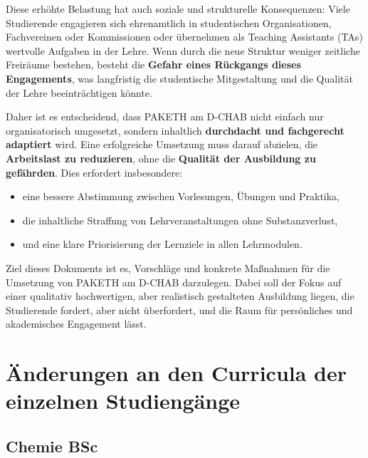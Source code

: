 \documentclass[a4paper]{article}
\begin{document}
Diese erhöhte Belastung hat auch soziale und strukturelle Konsequenzen:  
Viele Studierende engagieren sich ehrenamtlich in studentischen Organisationen, Fachvereinen oder Kommissionen oder übernehmen als Teaching Assistants (TAs) wertvolle Aufgaben in der Lehre.  
Wenn durch die neue Struktur weniger zeitliche Freiräume bestehen, besteht die \textbf{Gefahr eines Rückgangs dieses Engagements}, was langfristig die studentische Mitgestaltung und die Qualität der Lehre beeinträchtigen könnte.  

Daher ist es entscheidend, dass PAKETH am D-CHAB nicht einfach nur organisatorisch umgesetzt, sondern inhaltlich \textbf{durchdacht und fachgerecht adaptiert} wird.  
Eine erfolgreiche Umsetzung muss darauf abzielen, die \textbf{Arbeitslast zu reduzieren}, ohne die \textbf{Qualität der Ausbildung zu gefährden}.  
Dies erfordert insbesondere:
\begin{itemize}[leftmargin=2em]
    \item eine bessere Abstimmung zwischen Vorlesungen, Übungen und Praktika,
    \item die inhaltliche Straffung von Lehrveranstaltungen ohne Substanzverlust,
    \item und eine klare Priorisierung der Lernziele in allen Lehrmodulen.
\end{itemize}

Ziel dieses Dokuments ist es, Vorschläge und konkrete Maßnahmen für die Umsetzung von PAKETH am D-CHAB darzulegen.  
Dabei soll der Fokus auf einer qualitativ hochwertigen, aber realistisch gestalteten Ausbildung liegen, die Studierende fordert, aber nicht überfordert, und die Raum für persönliches und akademisches Engagement lässt.

\section{Änderungen an den Curricula der einzelnen Studiengänge}

\subsection{Chemie BSc}

\renewcommand{\arraystretch}{1.2}
\end{document}
